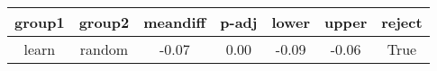 \begin{tabular}{|c|c|c|c|c|c|c|}
\toprule
group1 &  group2 &  meandiff &  p-adj &  lower &  upper &  reject \\
\midrule
 learn &  random &     -0.07 &   0.00 &  -0.09 &  -0.06 &    True \\
\bottomrule
\end{tabular}
